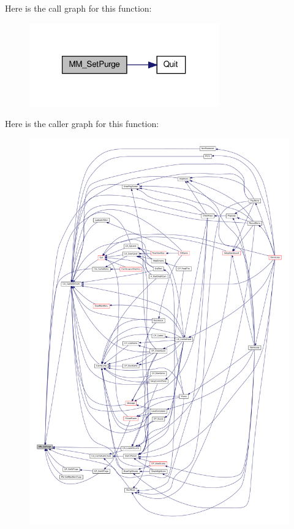 Here is the call graph for this function:
\nopagebreak
\begin{figure}[H]
\begin{center}
\leavevmode
\includegraphics[width=232pt]{ID__MM_8C_a114de4a52bcc47e8d668ab78a7c702c9_cgraph}
\end{center}
\end{figure}




Here is the caller graph for this function:
\nopagebreak
\begin{figure}[H]
\begin{center}
\leavevmode
\includegraphics[width=400pt]{ID__MM_8C_a114de4a52bcc47e8d668ab78a7c702c9_icgraph}
\end{center}
\end{figure}


